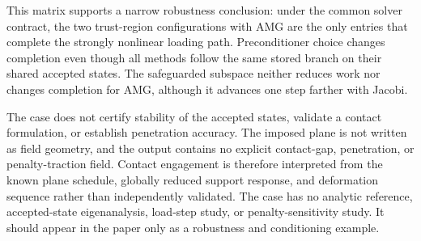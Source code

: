\documentclass[11pt]{article}
\begin{document}
This matrix supports a narrow robustness conclusion: under the common solver
contract, the two trust-region configurations with AMG are the only entries
that complete the strongly nonlinear loading path.  Preconditioner choice
changes completion even though all methods follow the same stored branch on
their shared accepted states.  The safeguarded subspace neither reduces work
nor changes completion for AMG, although it advances one step farther with
Jacobi.

The case does not certify stability of the accepted states, validate a contact
formulation, or establish penetration accuracy.  The imposed plane is not
written as field geometry, and the output contains no explicit contact-gap,
penetration, or penalty-traction field.  Contact engagement is therefore
interpreted from the known plane schedule, globally reduced support response,
and deformation sequence rather than independently validated.  The case has
no analytic reference, accepted-state eigenanalysis, load-step study, or
penalty-sensitivity study.  It should appear in the paper only as a robustness
and conditioning example.
\end{document}
